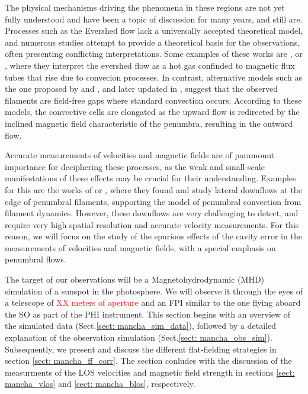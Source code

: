 The physical mechanisms driving the phenomena in these regions are not yet fully understood and have been a topic of discussion for many years, and still are. Processes such as the Evershed flow lack a universally accepted theoretical model, and numerous studies attempt to provide a theoretical basis for the observations, often presenting conflicting interpretations. Some examples of these works are \citep{evershed_magnetic_flux}, or \citep{evershed_magnetic_2}, where they interpret the evershed flow as a hot gas confinded to magnetic flux tubes that rise due to convecion processes. In contrast, alternative models such as the one proposed by \citealt{evershed_model_scharmer} and \citealt{evershed_model_spruit}, and later updated in \citealt{evershed_magnetic_scharmer}, suggest that the observed filaments are field-free gaps where standard convection occurs. According to these models, the convective cells are elongated as the upward flow is redirected by the inclined magnetic field characteristic of the penumbra, resulting in the outward flow.  

Accurate measurements of velocities and magnetic fields are of paramount importance for deciphering these processes, as the weak and small-scale manifestations of these effects may be crucial for their understanding. Examples for this are the works of \citealt{lateral_downflows_2} or \citealt{lateral_downflows}, where they found and study lateral downflows at the edge of penumbral filaments, supporting the model of penumbral convection from filament dynamics. However, these downflows are very challenging to detect, and require very high spatial resolution and accurate velocity measurements. For this reason, we will focus on the study of the spurious effects of the cavity error in the measurements of velocities and magnetic fields, with a special emphasis on penumbral flows. 

The target of our observations will be a Magnetohydrodynamic (MHD) simulation of a sunspot in the photosphere. We will observe it through the eyes of a telescope of \textcolor{red}{XX meters of aperture} and an FPI similar to the one flying aboard the SO as part of the PHI instrument. This section begins with an overview of the simulated data (Sect.\ref{sect: mancha_sim_data}), followed by a detailed explanation of the observation simulation (Sect.\ref{sect: mancha_obs_sim}). Subsequently, we present and discuss the different flat-fielding strategies in section \ref{sect: mancha_ff_corr}. The section conludes with the discussion of the measurments of the LOS velocities and magnetic field strength in sections \ref{sect: mancha_vlos} and \ref{sect: mancha_blos}, respectively.  



